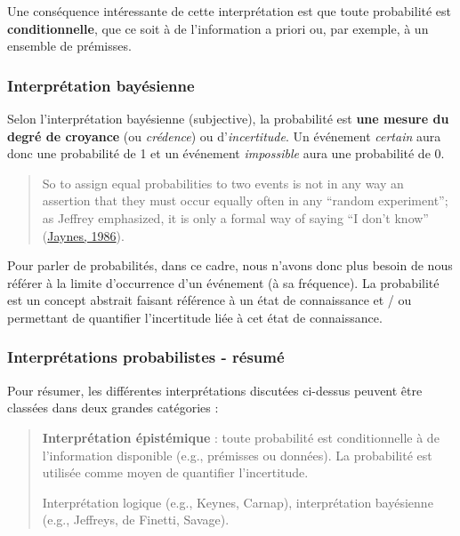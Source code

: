 \documentclass[
  a4paper,11pt,twoside,onecolumn,openright,final,oldfontcommands]{memoir}
\theoremstyle{definition}
\theoremstyle{definition}
\theoremstyle{definition}
\theoremstyle{definition}
\theoremstyle{remark}
\begin{document}
Une conséquence intéressante de cette interprétation est que toute probabilité est \textbf{conditionnelle}, que ce soit à de l'information a priori ou, par exemple, à un ensemble de prémisses.

\hypertarget{interpruxe9tation-bayuxe9sienne}{%
\subsubsection{Interprétation bayésienne}\label{interpruxe9tation-bayuxe9sienne}}

Selon l'interprétation bayésienne (subjective), la probabilité est \textbf{une mesure du degré de croyance} (ou \emph{crédence}) ou d'\emph{incertitude}. Un événement \emph{certain} aura donc une probabilité de 1 et un événement \emph{impossible} aura une probabilité de 0.

\begin{quote}
So to assign equal probabilities to two events is not in any way an assertion that they must occur equally often in any ``random experiment''; as Jeffrey emphasized, it is only a formal way of saying ``I don't know'' (\protect\hyperlink{ref-jaynes_bayesian_1986}{Jaynes, 1986}).
\end{quote}

Pour parler de probabilités, dans ce cadre, nous n'avons donc plus besoin de nous référer à la limite d'occurrence d'un événement (à sa fréquence). La probabilité est un concept abstrait faisant référence à un état de connaissance et / ou permettant de quantifier l'incertitude liée à cet état de connaissance.

\hypertarget{interpruxe9tations-probabilistes---ruxe9sumuxe9}{%
\subsubsection{Interprétations probabilistes - résumé}\label{interpruxe9tations-probabilistes---ruxe9sumuxe9}}

Pour résumer, les différentes interprétations discutées ci-dessus peuvent être classées dans deux grandes catégories :

\begin{quote}
\textbf{Interprétation épistémique} : toute probabilité est conditionnelle à de l'information disponible (e.g., prémisses ou données). La probabilité est utilisée comme moyen de quantifier l'incertitude.

Interprétation logique (e.g., Keynes, Carnap), interprétation bayésienne (e.g., Jeffreys, de Finetti, Savage).
\end{quote}
\end{document}
